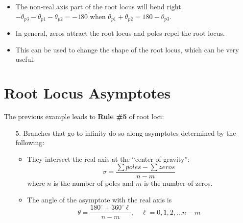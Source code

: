 \documentclass{book}
\begin{document}
	\begin{itemize}
		\item The non-real axis part of the root locus will bend right.
		\subitem $ -\theta_{p3}-\theta_{p1}-\theta_{p2} = -180 $ when $ \theta_{p1}+\theta_{p2} = 180 - \theta_{p3} $.
		\item In general, zeros attract the root locus and poles repel the root locus.
		\item This can be used to change the shape of the root locus, which can be very useful.
	\end{itemize}
	
	\section*{Root Locus Asymptotes}
	The previous example leads to \textbf{Rule \#5} of root loci:
	\begin{itemize}
		\item[5.] Branches that go to infinity do so along asymptotes determined by the following:
		\begin{itemize}
			\item They intersect the real axis at the ``center of gravity'':
			\begin{equation}
			\sigma = \frac{\sum poles - \sum zeros}{n-m}
			\end{equation}
			where $ n $ is the number of poles and $ m $ is the number of zeros.
			\item The angle of the asymptote with the real axis is
			\begin{equation}
			\theta = \frac{180^\circ + 360^\circ \ell}{n-m},\quad \ell = 0,1,2,\ldots n-m
			\end{equation}
		\end{itemize}
	\end{itemize}
	
\end{document}
